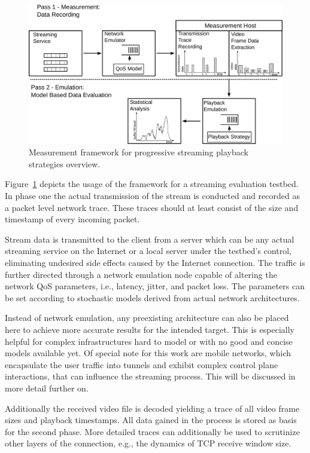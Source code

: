 \begin{figure}[htb]
	\includegraphics[width=1.0\textwidth]{images/measurement-model.pdf}
	\caption{Measurement framework for progressive streaming playback strategies overview.}
\label{c3:fig:framework}
\end{figure}

Figure~\ref{c3:fig:framework} depicts the usage of the framework for a streaming evaluation testbed. In phase one the actual transmission of the stream is conducted and recorded as a packet level network trace. These traces should at least consist of the size and timestamp of every incoming packet.

Stream data is transmitted to the client from a server which can be any actual streaming service on the Internet or a local server under the testbed's control, eliminating undesired side effects caused by the Internet connection. The traffic is further directed through a network emulation node capable of altering the network \gls{QoS} parameters, i.e., latency, jitter, and packet loss. The parameters can be set according to stochastic models derived from actual network architectures. 

Instead of network emulation, any preexisting architecture can also be placed here to achieve more accurate results for the intended target. This is especially helpful for complex infrastructures hard to model or with no good and concise models available yet. Of special note for this work are mobile networks, which encapsulate the user traffic into tunnels and exhibit complex control plane interactions, that can influence the streaming process. This will be discussed in more detail further on.

Additionally the received video file is decoded yielding a trace of all video frame sizes and playback timestamps. All data gained in the process is stored as basis for the second phase. More detailed traces can additionally be used to scrutinize other layers of the connection, e.g., the dynamics of \gls{TCP} receive window size. 

